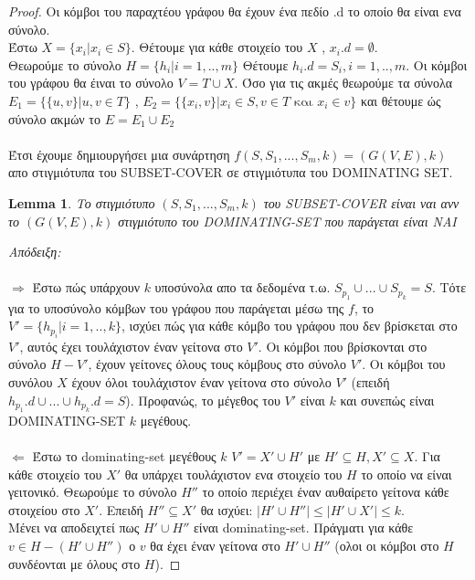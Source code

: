 \documentclass{article}
\newtheorem{lemma}[theorem]{Lemma}
\begin{document}
\begin{proof}
		Οι κόμβοι του παραχτέου γράφου θα έχουν ένα πεδίο .d το οποίο θα είναι ενα σύνολο.\\
		Έστω $X = \{x_i| x_i \in S\}$. Θέτουμε για κάθε στοιχείο του $X$ , $x_i.d = \emptyset$.\\
		Θεωρούμε το σύνολο $Η = \{h_i | i = 1,..,m\}$
		Θέτουμε  $h_i.d = S_i , i = 1,..,m$. Οι κόμβοι του γράφου θα έιναι το σύνολο $V = T \cup X$. Όσο για
		τις ακμές θεωρούμε τα σύνολα $E_1 = \{\{u,v\} | u,v \in  T \}$ , $E_2 = \{\{x_i,v\} | x_i \in S , v \in T \text{ και } x_i \in v  \}$
		και θέτουμε ώς σύνολο ακμών το $E = E_1 \cup E_2$\\
		\\
		Έτσι έχουμε δημιουργήσει μια συνάρτηση  $f(S,S_1,...,S_m,k) = (G(V,E) , k)$ απο στιγμιότυπα του SUBSET-COVER σε στιγμιότυπα του DOMINATING
		SET.
		\begin{lemma}
			Το στιγμιότυπο $(S,S_1,...,S_m,k)$ του SUBSET-COVER είναι ναι ανν το $(G(V,E) , k)$ στιγμιότυπο του DOMINATING-SET που παράγεται είναι ΝΑΙ
		\end{lemma}
		\textit{Απόδειξη:}\\
		\\
		\textit{$\Longrightarrow$} Έστω πώς υπάρχουν $k$ υποσύνολα απο τα δεδομένα τ.ω. $ S_{p_1} \cup ... \cup S_{p_k} = S $. Τότε για το υποσύνολο κόμβων
					 του γράφου που παράγεται μέσω της $f$, το $V'= \{h_{p_i} | i=1,..,k \}$, ισχύει πώς για κάθε κόμβο του γράφου που δεν βρίσκεται
					 στο $V'$, αυτός έχει τουλάχιστον έναν γείτονα στο $V'$. Οι κόμβοι που βρίσκονται στο σύνολο $H-V'$, έχουν γείτονες όλους
					 τους κόμβους στο σύνολο $V'$. Οι κόμβοι του συνόλου $X$ έχουν όλοι τουλάχιστον έναν γείτονα στο σύνολο $V'$ 
					 (επειδή $h_{p_1}.d \cup ... \cup h_{p_k}.d = S $).   
		       		 Προφανώς, το μέγεθος του $V'$ είναι $k$ και συνεπώς είναι DOMINATING-SET $k$ μεγέθους.\\
		       		 \\
		\textit{$\Longleftarrow$} 
			Έστω το dominating-set μεγέθους $k$ $V' = X' \cup H'$ με $H' \subseteq H , X' \subseteq X$. Για κάθε στοιχείο του $X'$ θα υπάρχει τουλάχιστον ενα
			στοιχείο του $H$ το οποίο να είναι γειτονικό. Θεωρούμε το σύνολο $H''$ το οποίο περιέχει έναν αυθαίρετο γείτονα κάθε στοιχείου στο $X'$. Επειδή
			$H'' \subseteq X'$ θα ισχύει: $|H' \cup H''| \leq |H' \cup X'| \leq k$.
			\\
			Μένει να αποδειχτεί πως $H' \cup H''$ είναι dominating-set.
			Πράγματι για κάθε $v \in H - (H' \cup H'')$ ο $v$ θα έχει έναν γείτονα στο $H' \cup H''$ (ολοι οι κόμβοι στο $H$ συνδέονται με όλους στο $H$).

\end{proof}
\end{document}
